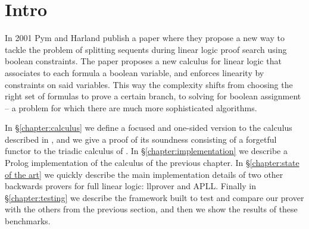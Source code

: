 \chapter{Intro}\label{chapter:intro}
In 2001 Pym and Harland publish a paper \cite{HarlandPym} where they propose a new way to tackle the problem of splitting sequents during linear logic proof search using boolean constraints.
The paper proposes a new calculus for linear logic that associates to each formula a boolean variable, and enforces linearity by constraints on said variables.
This way the complexity shifts from choosing the right set of formulas to prove a certain branch, to solving for boolean assignment -- a problem for which there are much more sophisticated algorithms.

In \S\ref{chapter:calculus} we define a focused and one-sided version to the calculus described in \cite{HarlandPym}, and we give a proof of its soundness consisting of a forgetful functor to the triadic calculus of \cite{Focusing}.
In \S\ref{chapter:implementation} we describe a Prolog implementation of the calculus of the previous chapter.
In \S\ref{chapter:state of the art} we quickly describe the main implementation details of two other backwards provers for full linear logic: llprover and APLL.
Finally in \S\ref{chapter:testing} we describe the framework built to test and compare our prover with the others from the previous section, and then we show the results of these benchmarks.


